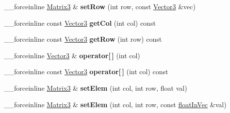 \begin{DoxyCompactItemize}
\item 
\hypertarget{classVectormath_1_1Aos_1_1Matrix3_aafb668fad9a1bdfcd9fd740ebd2e06a8}{\-\_\-\-\_\-forceinline \hyperlink{classVectormath_1_1Aos_1_1Matrix3}{Matrix3} \& {\bfseries set\-Row} (int row, const \hyperlink{classVectormath_1_1Aos_1_1Vector3}{Vector3} \&vec)}\label{classVectormath_1_1Aos_1_1Matrix3_aafb668fad9a1bdfcd9fd740ebd2e06a8}

\item 
\hypertarget{classVectormath_1_1Aos_1_1Matrix3_af99478271b4f24368fa0181602039fa0}{\-\_\-\-\_\-forceinline const \hyperlink{classVectormath_1_1Aos_1_1Vector3}{Vector3} {\bfseries get\-Col} (int col) const }\label{classVectormath_1_1Aos_1_1Matrix3_af99478271b4f24368fa0181602039fa0}

\item 
\hypertarget{classVectormath_1_1Aos_1_1Matrix3_ae5fb935a0847e76728c1d50c924ec533}{\-\_\-\-\_\-forceinline const \hyperlink{classVectormath_1_1Aos_1_1Vector3}{Vector3} {\bfseries get\-Row} (int row) const }\label{classVectormath_1_1Aos_1_1Matrix3_ae5fb935a0847e76728c1d50c924ec533}

\item 
\hypertarget{classVectormath_1_1Aos_1_1Matrix3_a54e7f52f39b408c4be974f9f16e3508a}{\-\_\-\-\_\-forceinline \hyperlink{classVectormath_1_1Aos_1_1Vector3}{Vector3} \& {\bfseries operator\mbox{[}$\,$\mbox{]}} (int col)}\label{classVectormath_1_1Aos_1_1Matrix3_a54e7f52f39b408c4be974f9f16e3508a}

\item 
\hypertarget{classVectormath_1_1Aos_1_1Matrix3_aae9b49cc796d80afaccbc35aa2a525e5}{\-\_\-\-\_\-forceinline const \hyperlink{classVectormath_1_1Aos_1_1Vector3}{Vector3} {\bfseries operator\mbox{[}$\,$\mbox{]}} (int col) const }\label{classVectormath_1_1Aos_1_1Matrix3_aae9b49cc796d80afaccbc35aa2a525e5}

\item 
\hypertarget{classVectormath_1_1Aos_1_1Matrix3_ac5b712069f811b123498eb8dbe29093e}{\-\_\-\-\_\-forceinline \hyperlink{classVectormath_1_1Aos_1_1Matrix3}{Matrix3} \& {\bfseries set\-Elem} (int col, int row, float val)}\label{classVectormath_1_1Aos_1_1Matrix3_ac5b712069f811b123498eb8dbe29093e}

\item 
\hypertarget{classVectormath_1_1Aos_1_1Matrix3_a07d966797e8e539f0928a2fe6232f3f2}{\-\_\-\-\_\-forceinline \hyperlink{classVectormath_1_1Aos_1_1Matrix3}{Matrix3} \& {\bfseries set\-Elem} (int col, int row, const \hyperlink{classVectormath_1_1floatInVec}{float\-In\-Vec} \&val)}\label{classVectormath_1_1Aos_1_1Matrix3_a07d966797e8e539f0928a2fe6232f3f2}


\end{DoxyCompactItemize}
